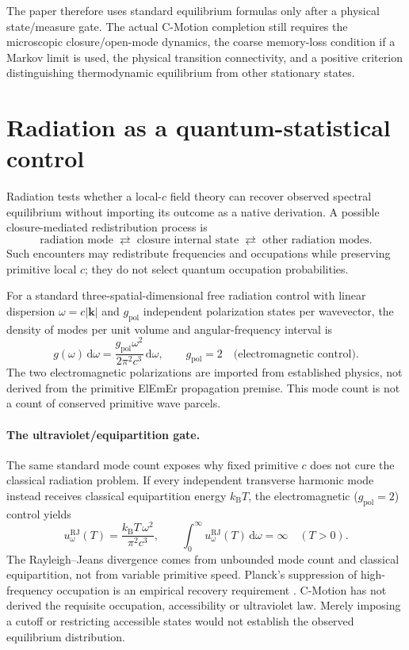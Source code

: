 \documentclass[11pt]{article}
\theoremstyle{definition}
\newcommand{\cmotion}{\mbox{C-Motion}}
\newcommand{\ElEmEr}{\mbox{ElEmEr}}
\newcommand{\dd}{\mathrm{d}}
\newcommand{\kb}{k_{\mathrm B}}
\begin{document}
The paper therefore uses standard equilibrium formulas only after a physical state/measure
gate.  The actual \cmotion{} completion still requires the microscopic closure/open-mode
dynamics, the coarse memory-loss condition if a Markov limit is used, the physical transition
connectivity, and a positive criterion distinguishing thermodynamic equilibrium from other
stationary states.

\section{Radiation as a quantum-statistical control}
\label{sec:radiation}
Radiation tests whether a local-$c$ field theory can recover observed
spectral equilibrium without importing its outcome as a native derivation.
A possible closure-mediated redistribution process is
\begin{equation}
  \boxed{
  \text{radiation mode}
  \;\rightleftarrows\;
  \text{closure internal state}
  \;\rightleftarrows\;
  \text{other radiation modes}.}
  \label{eq:radiation-matter-cycle}
\end{equation}
Such encounters may redistribute frequencies and occupations while preserving
primitive local $c$; they do not select quantum occupation probabilities.

For a standard three-spatial-dimensional free radiation control with linear
dispersion $\omega=c|\mathbf k|$ and $g_{\mathrm{pol}}$ independent polarization
states per wavevector, the density of modes per unit volume and angular-frequency
interval is
\begin{equation}
  g(\omega)\,\dd\omega
  =\frac{g_{\mathrm{pol}}\omega^2}{2\pi^2c^3}\,\dd\omega,
  \qquad g_{\mathrm{pol}}=2\quad\text{(electromagnetic control)}.
  \label{eq:mode-density-control}
\end{equation}
The two electromagnetic polarizations are imported from established physics,
not derived from the primitive \ElEmEr{} propagation premise.  This mode
count is not a count of conserved primitive wave parcels.
\paragraph{The ultraviolet/equipartition gate.}
The same standard mode count exposes why fixed primitive $c$ does not cure
the classical radiation problem. If every independent transverse harmonic
mode instead receives classical equipartition energy $\kb T$, the
electromagnetic ($g_{\mathrm{pol}}=2$) control yields
\begin{equation}
  u_{\omega}^{\mathrm{RJ}}(T)
  =\frac{\kb T\,\omega^2}{\pi^2c^3},\qquad
  \int_0^\infty u_{\omega}^{\mathrm{RJ}}(T)\,\dd\omega=\infty
  \quad(T>0).
  \label{eq:rayleigh-jeans-uv-gate}
\end{equation}
The Rayleigh--Jeans divergence \cite{Rayleigh1900,Jeans1905} comes from unbounded mode count and classical
equipartition, not from variable primitive speed.  Planck's suppression of
high-frequency occupation is an empirical recovery requirement
\cite{Planck1900}.  C-Motion has not derived the requisite occupation,
accessibility or ultraviolet law.  Merely imposing a cutoff or restricting
accessible states would not establish the observed equilibrium distribution.
\end{document}
